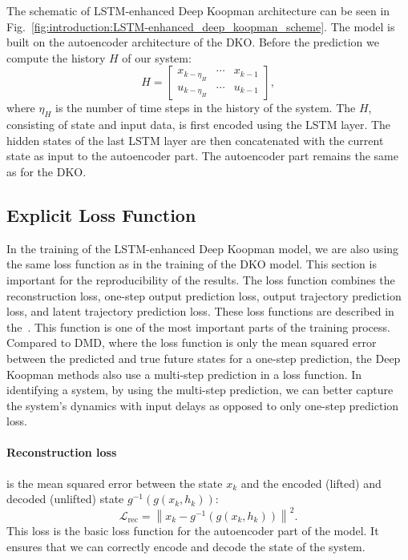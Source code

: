 \documentclass[conference]{IEEEtran}
\begin{document}
The schematic of LSTM-enhanced Deep Koopman architecture can be seen in Fig.~\ref{fig:introduction:LSTM-enhanced_deep_koopman_scheme}. The model is built on the autoencoder architecture of the DKO\@. Before the prediction we compute the history \(H\) of our system:
\begin{equation}
    H = \begin{bmatrix}
    x_{k - \eta_H} & \cdots & x_{k-1} \\
    u_{k - \eta_H} & \cdots & u_{k-1}
    \end{bmatrix},
\end{equation}
where \(\eta_H\) is the number of time steps in the history of the system.     
The \(H\), consisting of state and input data, is first encoded using the LSTM layer. The hidden states of the last LSTM layer are then concatenated with the current state as input to the autoencoder part. The autoencoder part remains the same as for the DKO\@.

\subsection{Explicit Loss Function}\label{subsec:methodology:explicit_loss}
In the training of the LSTM-enhanced Deep Koopman model, we are also using the same loss function as in the training of the DKO model.
This section is important for the reproducibility of the results.
The loss function combines the reconstruction loss, one-step output prediction loss, output trajectory prediction loss, and latent trajectory prediction loss. These loss functions are described in the~\cite{lusch2018deep}. This function is one of the most important parts of the training process. Compared to DMD, where the loss function is only the mean squared error between the predicted and true future states for a one-step prediction, the Deep Koopman methods also use a multi-step prediction in a loss function. In identifying a system, by using the multi-step prediction, we can better capture the system's dynamics with input delays as opposed to only one-step prediction loss.

\paragraph*{Reconstruction loss}
is the mean squared error between the state \(x_k\) and the encoded (lifted) and decoded (unlifted) state \(g^{-1}(g(x_k,h_k))\):
\begin{equation}
    \mathcal{L}_{\text{rec}} = \left \|x_k - g^{-1}(g(x_k,h_k))\right \|^2.
\end{equation}
This loss is the basic loss function for the autoencoder part of the model. It ensures that we can correctly encode and decode the state of the system.
\end{document}
